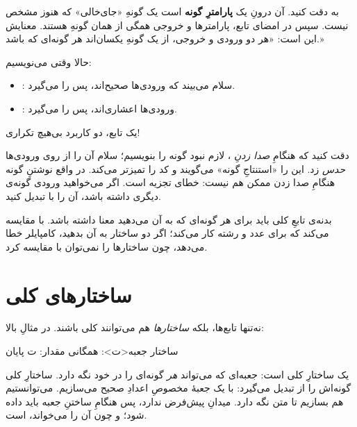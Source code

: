 به  دقت کنید. آن  درونِ \code{<\,>} یک \textbf{پارامترِ
گونه} است یک گونهِ «جای‌خالی» که هنوز مشخص نیست. سپس در امضای تابع،
پارامترها و خروجی همگی از همان گونهِ  هستند. معنایش این است: «هر دو
ورودی و خروجی، از یک گونهِ یکسان‌اند هر گونه‌ای که باشد.»

حالا وقتی می‌نویسیم:
\begin{itemize}
  \item {}: سلام می‌بیند که ورودی‌ها صحیح‌اند، پس  را
         می‌گیرد.
  \item {}: ورودی‌ها اعشاری‌اند، پس  را
         می‌گیرد.
\end{itemize}

یک تابع، دو کاربرد بی‌هیچ تکراری!

\begin{note}
دقت کنید که هنگامِ \emph{صدا زدنِ} ، لازم نبود گونه را بنویسیم؛ سلام
آن را از روی ورودی‌ها \emph{حدس} زد. این را «استنتاجِ گونه» می‌گویند و کد را
تمیزتر می‌کند. در واقع نوشتنِ گونه هنگامِ صدا زدن ممکن هم نیست:
 خطای تجزیه است. اگر می‌خواهید ورودی گونه‌ی دیگری
داشته باشد، آن را با  تبدیل کنید.

بدنه‌ی تابعِ کلی باید برای هر گونه‌ای که به آن می‌دهید معنا داشته باشد.
 با \code{>} مقایسه می‌کند که برای عدد و رشته کار می‌کند؛ اگر دو
ساختار به آن بدهید، کامپایلر خطا می‌دهد، چون ساختارها را نمی‌توان با \code{>}
مقایسه کرد.
\end{note}

\section{ساختارهای کلی}

نه‌تنها تابع‌ها، بلکه \emph{ساختارها} هم می‌توانند کلی باشند. در مثالِ بالا:

\begin{salamfa}
ساختار جعبه<ت>:
    همگانی مقدار: ت
پایان
\end{salamfa}

 یک ساختارِ کلی است: جعبه‌ای که می‌تواند \emph{هر} گونه‌ای را در خود
نگه دارد. ساختارِ کلی گونه‌اش را از تبدیل می‌گیرد: با
 یک جعبهٔ مخصوصِ اعدادِ صحیح
می‌سازیم. می‌توانستیم  هم بسازیم تا متن نگه دارد. میدانِ
 پیش‌فرض ندارد، پس هنگامِ ساختنِ جعبه باید داده شود؛ و چون
 آن را می‌خواند،  است.

